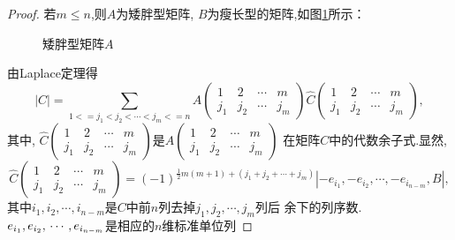 \begin{proof}
若$m \le n$,则$A$为矮胖型矩阵, $B$为瘦长型的矩阵,如图\ref{fig:Matrix2}所示：

  \begin{figure}[!ht]
   \begin{center}
  \end{center}
  \caption{矮胖型矩阵$A$\label{fig:Matrix2}}
\end{figure}
由Laplace定理得
\begin{equation}\label{eq:Matrix3}
  |C|= \sum\limits_{1<=j_1<j_2<\cdots<j_m<=n}
  A\left(\begin{smallmatrix}
      1 & 2 & \cdots & m \\
      j_1 & j_2 & \cdots & j_m \end{smallmatrix}\right)
  \hat C\left(\begin{smallmatrix}
      1 & 2 & \cdots & m \\
      j_1 & j_2 & \cdots & j_m
    \end{smallmatrix}\right),
\end{equation}
其中, $\hat C\left(\begin{smallmatrix}
      1 & 2 & \cdots & m \\
      j_1 & j_2 & \cdots & j_m
      \end{smallmatrix}\right)$是$A\left(\begin{smallmatrix}
      1 & 2 & \cdots & m \\
      j_1 & j_2 & \cdots & j_m \end{smallmatrix}\right)$
  在矩阵$C$中的代数余子式.显然,
  \begin{equation}\label{eq:Matrix4}
    \hat C\left(\begin{smallmatrix}
      1 & 2 & \cdots & m \\
      j_1 & j_2 & \cdots & j_m
    \end{smallmatrix}\right)=(-1)^{\frac{1}{2}m(m+1)+(j_1+j_2+\cdots+j_m)}%
  |-e_{i_1},-e_{i_2},\cdots,-e_{i_{n-m}},B|,
  \end{equation}
  其中$i_1,i_2,\cdots,i_{n-m}$是$C$中前$n$列去掉$j_1,j_2,\cdots,j_m$列后
  余下的列序数. $e_{i_1},e_{i_2},\\\cdots,e_{i_{n-m}}$是相应的$n$维标准单位列

\end{proof}
